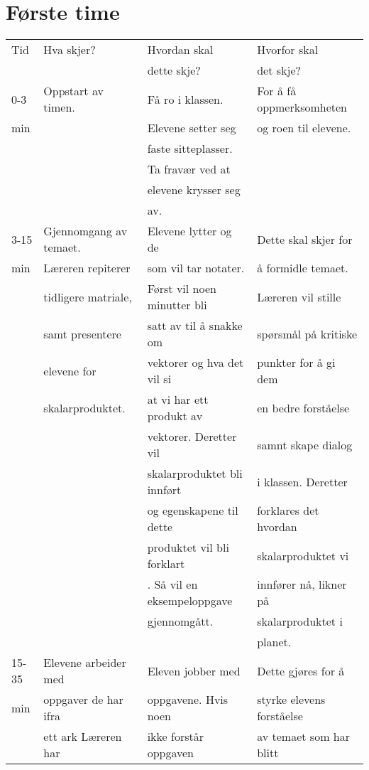 \documentclass[11pt]{article}
\date{}
\title{}
\begin{document}
\section{Første time}
\label{sec-1}

\begin{center}
\begin{tabular}{llll}
Tid & Hva skjer? & Hvordan skal & Hvorfor skal\\
 &  & dette skje? & det skje?\\
\hline
0-3 & Oppstart av timen. & Få ro i klassen. & For å få oppmerksomheten\\
min &  & Elevene setter seg & og roen til elevene.\\
 &  & faste sitteplasser. & \\
 &  & Ta fravær ved at & \\
 &  & elevene krysser seg & \\
 &  & av. & \\
\hline
3-15 & Gjennomgang av temaet. & Elevene lytter og de & Dette skal skjer for\\
min & Læreren repiterer & som vil tar notater. & å formidle temaet.\\
 & tidligere matriale, & Først vil noen minutter bli & Læreren vil stille\\
 & samt presentere & satt av til å snakke om & spørsmål på kritiske\\
 & elevene for & vektorer og hva det vil si & punkter for å gi dem\\
 & skalarproduktet. & at vi har ett produkt av & en bedre forståelse\\
 &  & vektorer. Deretter vil & samnt skape dialog\\
 &  & skalarproduktet bli innført & i klassen. Deretter\\
 &  & og egenskapene til dette & forklares det hvordan\\
 &  & produktet vil bli forklart & skalarproduktet vi\\
 &  & . Så vil en eksempeloppgave & innfører nå, likner på\\
 &  & gjennomgått. & skalarproduktet i\\
 &  &  & planet.\\
\hline
15-35 & Elevene arbeider med & Eleven jobber med & Dette gjøres for å\\
min & oppgaver de har ifra & oppgavene. Hvis noen & styrke elevens forståelse\\
 & ett ark Læreren har & ikke forstår oppgaven & av temaet som har blitt\\

\end{tabular}
\end{center}
\end{document}
